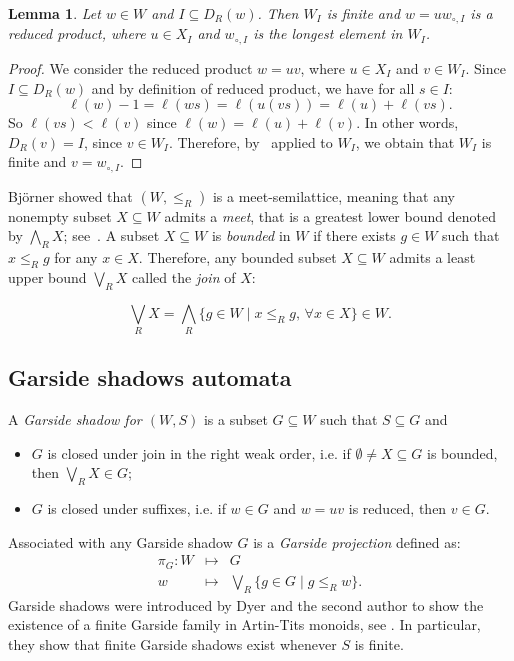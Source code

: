 \documentclass{amsart}
\newtheorem{Lemma}[Theorem]{Lemma}
\theoremstyle{definition}
\begin{document}
\begin{Lemma}\label{lem:Descents} Let $w\in W$ and $I\subseteq D_R(w)$. Then $W_I$ is finite and  $w=uw_{\circ,I}$ is a reduced product, where $u\in X_I$ and $w_{\circ,I}$ is the longest element in $W_I$. 
\end{Lemma}
\begin{proof} We consider the reduced product $w=uv$, where $u\in X_I$ and $v\in W_I$. Since $I\subseteq D_R(w)$ and by definition of reduced product,  we have for all $s\in I$:
$$
\ell(w)-1=\ell(ws)=\ell(u(vs))=\ell(u)+\ell(vs).
$$
So $\ell(vs)<\ell(v)$ since $\ell(w)=\ell(u)+\ell(v)$. In other words, $D_R(v)=I$, since $v\in W_I$. Therefore, by~\cite[Proposition~2.3.1~(ii)]{BB} applied to $W_I$, we obtain that $W_I$ is finite and $v=w_{\circ,I}$.
\end{proof}

Bj\"orner showed that $(W,\leq_R)$ is a meet-semilattice, meaning that any nonempty subset $X\subseteq W$ admits a {\em meet}, that is a greatest lower bound denoted by $\bigwedge_R X$; see~\cite[\S3.2]{BB}. A subset $X \subseteq W$ is \textit{bounded} in $W$ if there exists $g \in W$ such that $x \leq_R g$ for any $x \in X$. Therefore, any bounded subset $X \subseteq W$ admits a least upper bound $\bigvee_R X$ called the \textit{join} of $X$: 

$$
\bigvee_R X = \bigwedge_R\{g \in W \mid x \leq_R g, \, \forall x \in X\}\in W.
$$

\subsection{Garside shadows automata}\label{ss:Garside}

A \textit{Garside shadow for $(W,S)$} is a subset $G\subseteq W$ such that $S\subseteq G$ and
\begin{itemize}
\item[(i)] $G$ is closed under join in the right weak order, i.e. if $\emptyset \not = X\subseteq G$ is bounded, then $\bigvee_R X \in G$; 
\item[(ii)]$G$ is closed under suffixes, i.e. if $w\in G$ and $w=uv$ is reduced, then $v\in G$.
\end{itemize}
Associated with any Garside shadow $G$ is a {\em Garside projection} defined as:
\begin{eqnarray*}
\pi_G:W&\mapsto& G \\
w&\mapsto& \bigvee_R \{g\in G\mid g\leq_R w\}.
\end{eqnarray*}
Garside shadows were introduced by Dyer and the second author to show the existence of a finite Garside family in Artin-Tits monoids, see \cite{DH}. In particular, they show that finite Garside shadows exist  whenever $S$ is finite. 
\end{document}
